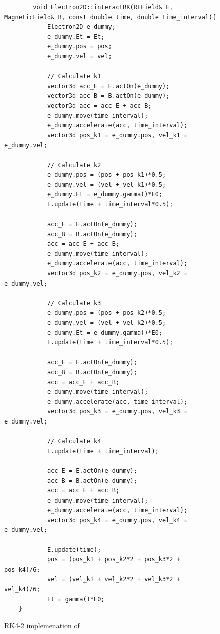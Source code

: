 \documentclass[a4paper,oneside,12pt]{report}
\numberwithin{equation}{chapter}
\begin{document}
\begin{figure}[H]
    \centering
    \captionsetup{justification=centering}
    \begin{verbatim}
        void Electron2D::interactRK(RFField& E, MagneticField& B, const double time, double time_interval){
            Electron2D e_dummy;
            e_dummy.Et = Et;
            e_dummy.pos = pos;
            e_dummy.vel = vel;
    
            // Calculate k1
            vector3d acc_E = E.actOn(e_dummy);
            vector3d acc_B = B.actOn(e_dummy);
            vector3d acc = acc_E + acc_B;
            e_dummy.move(time_interval);
            e_dummy.accelerate(acc, time_interval);
            vector3d pos_k1 = e_dummy.pos, vel_k1 = e_dummy.vel;
    
            // Calculate k2
            e_dummy.pos = (pos + pos_k1)*0.5;
            e_dummy.vel = (vel + vel_k1)*0.5;
            e_dummy.Et = e_dummy.gamma()*E0;
            E.update(time + time_interval*0.5);
    
            acc_E = E.actOn(e_dummy);
            acc_B = B.actOn(e_dummy);
            acc = acc_E + acc_B;
            e_dummy.move(time_interval);
            e_dummy.accelerate(acc, time_interval);
            vector3d pos_k2 = e_dummy.pos, vel_k2 = e_dummy.vel;
    
            // Calculate k3
            e_dummy.pos = (pos + pos_k2)*0.5;
            e_dummy.vel = (vel + vel_k2)*0.5;
            e_dummy.Et = e_dummy.gamma()*E0;
            E.update(time + time_interval*0.5);

            acc_E = E.actOn(e_dummy);
            acc_B = B.actOn(e_dummy);
            acc = acc_E + acc_B;
            e_dummy.move(time_interval);
            e_dummy.accelerate(acc, time_interval);
            vector3d pos_k3 = e_dummy.pos, vel_k3 = e_dummy.vel;
    
            // Calculate k4
            E.update(time + time_interval);

            acc_E = E.actOn(e_dummy);
            acc_B = B.actOn(e_dummy);
            acc = acc_E + acc_B;
            e_dummy.move(time_interval);
            e_dummy.accelerate(acc, time_interval);
            vector3d pos_k4 = e_dummy.pos, vel_k4 = e_dummy.vel;
    
            E.update(time);
            pos = (pos_k1 + pos_k2*2 + pos_k3*2 + pos_k4)/6;
            vel = (vel_k1 + vel_k2*2 + vel_k3*2 + vel_k4)/6;
            Et = gamma()*E0;
    }
    \end{verbatim}
\caption{RK4-2 implemenation of \eEM}
\label{fig:rk2_EM}
\end{figure}
\end{document}
